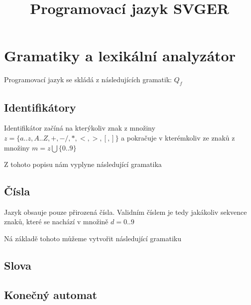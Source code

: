 \documentclass[a4paper,11pt]{article}
\title{Programovací jazyk SVGER}
\begin{document}
\maketitle
\newpage
\tableofcontents

\newpage
\section{Gramatiky a lexikální analyzátor}
Programovací jazyk se skládá z následujících gramatik:
$Q_{f}$
\subsection{Identifikátory}
Identifikátor začíná na kterýkoliv znak z množiny $z = \{a..z,A..Z,+,-/,*,<,>,[,]\}$
a pokračuje v kterémkoliv ze znaků z množiny $m = z \bigcup \{0..9\}$ 
\linebreak

Z tohoto popisu nám vyplyne následující gramatika 

\subsection{Čísla}
Jazyk obsauje pouze přirozená čísla. Validním číslem je tedy jakákoliv sekvence znaků, které se nachází v množině $d = {0..9}$

Ná základě tohoto můžeme vytvořit následující gramatiku 

\subsection{Slova}


\subsection{Konečný automat}

\end{document}
